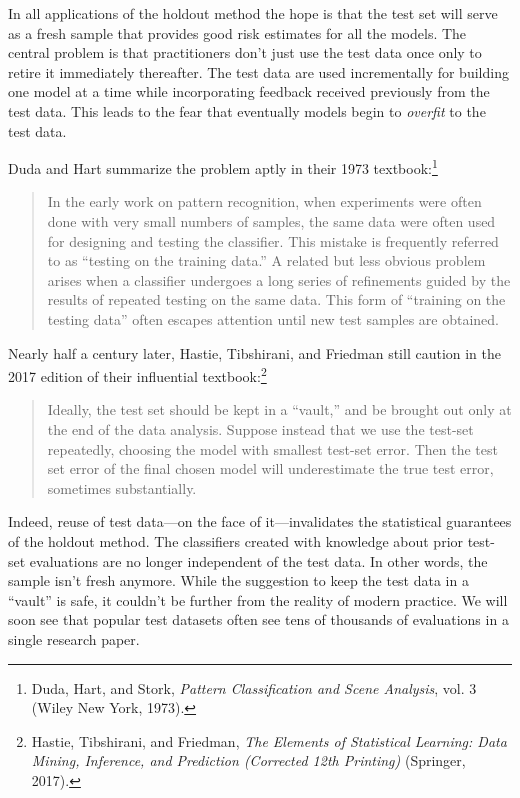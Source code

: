 \documentclass{tufte-book}
\begin{document}
In all applications of the holdout method the hope is that the test set
will serve as a fresh sample that provides good risk estimates for all
the models. The central problem is that practitioners don't just use the
test data once only to retire it immediately thereafter. The test data
are used incrementally for building one model at a time while
incorporating feedback received previously from the test data. This
leads to the fear that eventually models begin to \emph{overfit} to the
test data.

Duda and Hart summarize the problem aptly in their 1973
textbook:\footnote{Duda, Hart, and Stork, \emph{Pattern Classification
  and Scene Analysis}, vol. 3 (Wiley New York, 1973).}

\begin{quote}
In the early work on pattern recognition, when experiments were often
done with very small numbers of samples, the same data were often used
for designing and testing the classifier. This mistake is frequently
referred to as ``testing on the training data.'' A related but less
obvious problem arises when a classifier undergoes a long series of
refinements guided by the results of repeated testing on the same data.
This form of ``training on the testing data'' often escapes attention
until new test samples are obtained.
\end{quote}

Nearly half a century later, Hastie, Tibshirani, and Friedman still
caution in the 2017 edition of their influential textbook:\footnote{Hastie,
  Tibshirani, and Friedman, \emph{The Elements of Statistical Learning:
  Data Mining, Inference, and Prediction (Corrected 12th Printing)}
  (Springer, 2017).}

\begin{quote}
Ideally, the test set should be kept in a ``vault,'' and be brought out
only at the end of the data analysis. Suppose instead that we use the
test-set repeatedly, choosing the model with smallest test-set error.
Then the test set error of the final chosen model will underestimate the
true test error, sometimes substantially.
\end{quote}

Indeed, reuse of test data---on the face of it---invalidates the
statistical guarantees of the holdout method. The classifiers created
with knowledge about prior test-set evaluations are no longer
independent of the test data. In other words, the sample isn't fresh
anymore. While the suggestion to keep the test data in a ``vault'' is
safe, it couldn't be further from the reality of modern practice. We
will soon see that popular test datasets often see tens of thousands of
evaluations in a single research paper.
\end{document}
